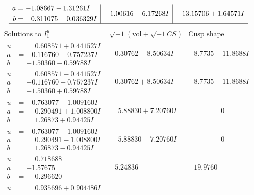 \documentclass[1p]{elsarticle_modified}
\theoremstyle{definition}
\newcommand{\I}{\sqrt{-1}}
\begin{document}
$$\begin{array}{c|c|c}
\begin{aligned}
a &= -1.08667 - 1.31261 I \\
b &= \phantom{-}0.311075 - 0.036329 I\end{aligned}
 & -1.00616 - 6.17268 I & -13.15706 + 1.64571 I\\
 \hline 
 \end{array}$$\newpage$$\begin{array}{c|c|c}  
\text{Solutions to }I^u_{1}& \I (\text{vol} + \sqrt{-1}CS) & \text{Cusp shape}\\
 \hline 
\begin{aligned}
u &= \phantom{-}0.608571 + 0.441527 I \\
a &= -0.116760 - 0.757237 I \\
b &= -1.50360 - 0.59788 I\end{aligned}
 & -0.30762 - 8.50634 I & -8.7735 + 11.8688 I \\ \hline\begin{aligned}
u &= \phantom{-}0.608571 - 0.441527 I \\
a &= -0.116760 + 0.757237 I \\
b &= -1.50360 + 0.59788 I\end{aligned}
 & -0.30762 + 8.50634 I & -8.7735 - 11.8688 I \\ \hline\begin{aligned}
u &= -0.763077 + 1.009160 I \\
a &= \phantom{-}0.290491 + 1.008800 I \\
b &= \phantom{-}1.26873 + 0.94425 I\end{aligned}
 & \phantom{-}5.88830 + 7.20760 I & \phantom{-0.000000 } 0 \\ \hline\begin{aligned}
u &= -0.763077 - 1.009160 I \\
a &= \phantom{-}0.290491 - 1.008800 I \\
b &= \phantom{-}1.26873 - 0.94425 I\end{aligned}
 & \phantom{-}5.88830 - 7.20760 I & \phantom{-0.000000 } 0 \\ \hline\begin{aligned}
u &= \phantom{-}0.718688\phantom{ +0.000000I} \\
a &= -1.57675\phantom{ +0.000000I} \\
b &= \phantom{-}0.296620\phantom{ +0.000000I}\end{aligned}
 & -5.24836\phantom{ +0.000000I} & -19.9760\phantom{ +0.000000I} \\ \hline\begin{aligned}
u &= \phantom{-}0.935696 + 0.904486 I \\

\end{aligned}
\end{array}$$
\end{document}
